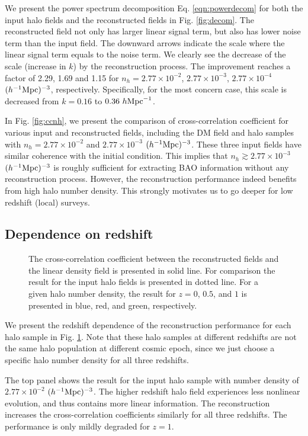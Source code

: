 \documentclass[iop]{emulateapj}
\newcommand{\mpch}{h^{-1} {\rm Mpc}}
\newcommand{\hmpc}{h {\rm Mpc}^{-1}}
\begin{document}
{We present the power spectrum decomposition Eq. \ref{eqn:powerdecom} for both the input halo fields and the reconstructed fields in Fig. \ref{fig:decom}.
The reconstructed field not only has larger linear signal term, but also has lower noise term than the input field.
The downward arrows indicate the scale where the linear signal term equals to the noise term.
We clearly see the decrease of the scale (increase in $k$) by the reconstruction process.
The improvement reaches a factor of 2.29, 1.69 and 1.15 for $n_h=2.77\times 10^{-2}$, $2.77\times 10^{-3}$, $2.77\times 10^{-4}$ $(\mpch)^{-3}$, respectively.
Specifically, for the most concern case, this scale is decreased from $k=0.16$ to $0.36\ \hmpc$.

In Fig. \ref{fig:ccnh}, we present the comparison of cross-correlation coefficient for various input and reconstructed fields, including the DM field and halo samples with $n_h=2.77\times 10^{-2}$ and $2.77\times 10^{-3}$ $(\mpch)^{-3}$.
These three input fields have similar coherence with the initial condition.
This implies that $n_h\gtrsim 2.77\times 10^{-3}$ $(\mpch)^{-3}$ is roughly sufficient for extracting BAO information without any reconstruction process.
However, the reconstruction performance indeed benefits from high halo number density.
This strongly motivates us to go deeper for low redshift (local) surveys.

\subsection{Dependence on redshift}
\label{sec:evo}

\begin{figure}
\epsfxsize=8.5cm
\caption{The cross-correlation coefficient between the reconstructed fields and the linear density field is presented in solid line.
For comparison the result for the input halo fields is presented in dotted line.
For a given halo number density, the result for $z=0$, $0.5$, and $1$ is presented in blue, red, and green, respectively.}
\label{fig:numevo}
\end{figure}

We present the redshift dependence of the reconstruction performance for each halo sample in Fig. \ref{fig:numevo}.
Note that these halo samples at different redshifts are not the same halo population at different cosmic epoch, since we just choose a specific halo number density for all three redshifts.

The top panel shows the result for the input halo sample with number density of $2.77\times 10^{-2}$ $(\mpch)^{-3}$. 
The higher redshift halo field experiences less nonlinear evolution, and thus contains more linear information.
The reconstruction increases the cross-correlation coefficients similarly for all three redshifts.
The performance is only mildly degraded for $z=1$.

}
\end{document}
